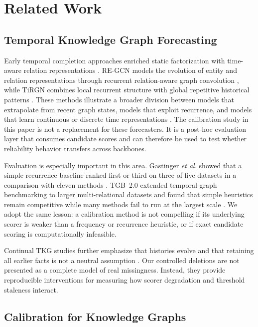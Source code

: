 \documentclass[information,article,submit,oneauthor,pdftex]{Definitions/mdpi}
\begin{document}
\section{Related Work}
\label{sec:related}

\subsection{Temporal Knowledge Graph Forecasting}

Early temporal completion approaches enriched static factorization with
time-aware relation representations \cite{garciaduran2018sequence}. RE-GCN
models the evolution of entity and relation representations through recurrent
relation-aware graph convolution \cite{li2021regcn}, while TiRGN combines local
recurrent structure with global repetitive historical patterns
\cite{li2022tirgn}. These methods illustrate a broader division between models
that extrapolate from recent graph states, models that exploit recurrence, and
models that learn continuous or discrete time representations
\cite{cai2023survey}. The calibration study in this paper is not a replacement
for these forecasters. It is a post-hoc evaluation layer that consumes candidate
scores and can therefore be used to test whether reliability behavior transfers
across backbones.

Evaluation is especially important in this area. Gastinger \emph{et al.}
showed that a simple recurrence baseline ranked first or third on three of five
datasets in a comparison with eleven methods \cite{gastinger2024repeat}. TGB~2.0
extended temporal graph benchmarking to larger multi-relational datasets and
found that simple heuristics remain competitive while many methods fail to run
at the largest scale \cite{gastinger2024tgb2}. We adopt the same lesson: a
calibration method is not compelling if its underlying scorer is weaker than a
frequency or recurrence heuristic, or if exact candidate scoring is
computationally infeasible.

Continual TKG studies further emphasize that histories evolve and that retaining
all earlier facts is not a neutral assumption
\cite{mirtaheri2023continual,zhang2025replay}. Our controlled deletions are not
presented as a complete model of real missingness. Instead, they provide
reproducible interventions for measuring how scorer degradation and threshold
staleness interact.

\subsection{Calibration for Knowledge Graphs}
\end{document}

